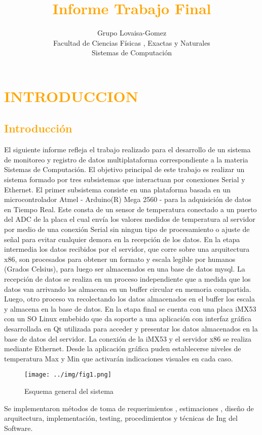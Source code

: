 \documentclass[a4paper,11pt]{book}
\title{\textcolor{orange}{Informe Trabajo Final}}
\author{Grupo Lovaisa-Gomez \\ Facultad de Ciencias Físicas , Exactas y
Naturales\\ Sistemas de Computación}
\begin{document}

\maketitle
\tableofcontents


\chapter{\textcolor{orange}{INTRODUCCION}}

\newpage
\section{\textcolor{orange}{Introducción}}
El siguiente informe refleja el trabajo realizado para el desarrollo de un
sistema de monitoreo y registro de datos multiplataforma correspondiente a la
materia Sistemas de Computación. El objetivo principal de este trabajo es
realizar un sistema formado por tres subsistemas que interactuan por
conexiones Serial y Ethernet. El primer subsistema consiste en una plataforma
basada en un microcontrolador Atmel - Arduino(R) Mega 2560 - para la
adquisición de datos en Tiempo Real. Este consta de un sensor de temperatura
conectado a un puerto del ADC de la placa el cual envía los valores medidos de
temperatura al servidor por medio de una conexión Serial sin ningun tipo de
procesamiento o ajuste de señal para evitar cualquier demora en la recepción de
los datos. 
En la etapa intermedia los datos recibidos por el servidor, que
corre sobre una arquitectura x86, son procesados para obtener un formato y
escala legible por humanos (Grados Celsius), para luego ser almacenados en una
base de datos mysql. La recepción de datos se realiza en un proceso
independiente que a medida que los datos van arrivando los almacena en un buffer
circular en memoria compartida. Luego, otro proceso va recolectando los datos
almacenados en el buffer los escala y almacena en la base de datos.
En la etapa final se cuenta con una placa iMX53 con un SO Linux embebido que da
soporte a una aplicación con interfaz gráfica desarrollada en Qt utilizada para
acceder y presentar los datos almacenados en la base de datos del servidor. La
conexión de la iMX53 y el servidor x86 se realiza mediante Ethernet. Desde la
aplicación gráfica puden establecerse niveles de temperatura Max y Min que
activarán indicaciones visuales en cada caso.   
\begin{figure}[h!]
 \begin{center}
  \texttt{[image: ../img/fig1.png]}
  \caption{Esquema general del sistema}
  \label{fig:esquema}
 \end{center}
\end{figure}
Se implementaron métodos de toma de requerimientos , estimaciones ,
diseño de arquitectura, implementación, testing, procedimientos y técnicas
de Ing del Software.
\end{document}
